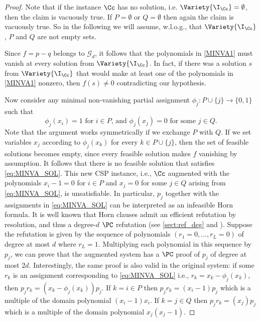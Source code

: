 \documentclass[11pt]{article}
\begin{document}
\begin{proof}
Note that if the instance $\Cc$ has no solution, i.e. $\Variety{\I_\Cc}=\emptyset$, then the claim is vacuously true. If $P=\emptyset$ or $Q=\emptyset$ then again the claim is vacuously true. So in the following we will assume, w.l.o.g., that $\Variety{\I_\Cc}$, $P$ and $Q$ are not empty sets.

Since $f=p-q$ belongs to $\mathcal{G}_d$, it follows that the polynomials in \eqref{MINVA1} must vanish at every solution from $\Variety{\I_\Cc}$. In fact, if there {was} a solution $s$ from $\Variety{\I_\Cc}$ that would make at least one of the polynomials in \eqref{MINVA1} nonzero, then $f(s)\not=0$ contradicting our hypothesis.

Now consider any minimal non-vanishing partial assignment $\phi_j:P\cup\{j\}\rightarrow \{0,1\}$ such that
\begin{equation}\label{eq:MINVA_SOL}
    \phi_j(x_i)=1 \text{ for } i\in P\text{, and  } {\phi_j(x_j) = 0} \text{ for some }j \in Q. 
\end{equation}
%
Note that the argument works symmetrically if we exchange $P$ with $Q$. If we set variables {$x_j$} according to {$\phi_j(x_k)$} for every $k \in P \cup \{j\}$, then the set of feasible solutions becomes empty, since every feasible solution makes $f$ vanishing by assumption. It follows that there is no feasible solution that satisfies \eqref{eq:MINVA_SOL}. This new CSP instance, i.e., $\Cc$ augmented with the polynomials $x_i - 1 = 0$ for $i \in P$ and $x_j = 0$ for some $j \in Q$ arising from \cref{eq:MINVA_SOL}, is unsatisfiable.
In particular, $p_j$ together with the assignments in \cref{eq:MINVA_SOL} can be interpreted as an infeasible Horn formula. It is well known that Horn clauses admit an efficient refutation by resolution, and thus a degree-$d$ $\PC$ refutation (see \cref{sect:ref_deg} and \cite{FlemingKothariPitassi19}). Suppose the refutation is given by the sequence of polynomials $(r_1=0,\dots,r_L=0)$ of degree at most $d$ where $r_L=1$. Multiplying each polynomial in this sequence by $p_j$, we can prove that the augmented system has a $\PC$ proof of $p_j$ of degree at most $2d$. Interestingly, the same proof is also valid in the original system: if some $r_k$ is an assignment corresponding to \cref{eq:MINVA_SOL} i.e., $r_k = x_k - \phi_j(x_k)$, then $p_j r_k = (x_k - \phi_j(x_k))p_j$. If $k = i \in P$ then $p_jr_k=(x_i-1)p_j$ which is a multiple of the domain polynomial $(x_i-1)x_i$. If $k = j \in Q$ then $p_jr_k=(x_j)p_j$ which is a multiple of the domain polynomial $x_j(x_j-1)$.

\end{proof}
\end{document}
